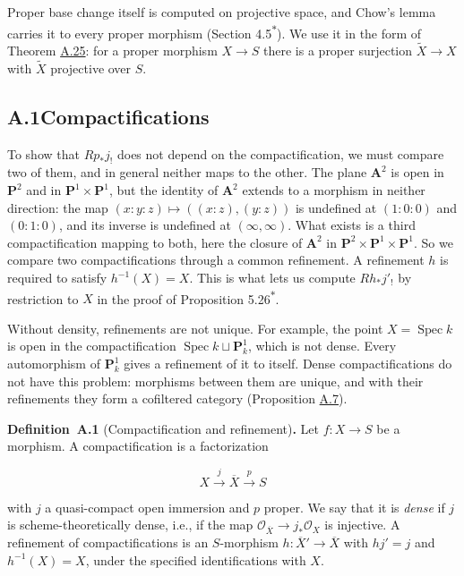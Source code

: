 \documentclass[11pt]{article}
\newenvironment{bpstatement}[2]{\par\addvspace{0.6\baselineskip}\noindent\textbf{#1}#2\textbf{.}\enspace\ignorespaces}
  {\par\addvspace{0.4\baselineskip}}
\newcommand{\bpout}[1]{#1\textsuperscript{\hyperlink{bp-outside}{\ensuremath{\ast}}}}
\begin{document}
Proper base change itself is computed on projective space, and Chow's lemma carries it to every proper morphism (Section \bpout{4.5}). We use it in the form of Theorem \hyperref[bp73]{A.25}: for a proper morphism \(X\to S\) there is a proper surjection \(\widetilde X\to X\) with \(\widetilde X\) projective over \(S\).

\subsection*{\texorpdfstring{A.1\quad Compactifications}{A.1 Compactifications}}
\label{bp5}%
\label{bp6}%
To show that \(Rp_*j_!\) does not depend on the compactification, we must compare two of them, and in general neither maps to the other. The plane \(\mathbf A^2\) is open in \(\mathbf P^2\) and in \(\mathbf P^1\times\mathbf P^1\), but the identity of \(\mathbf A^2\) extends to a morphism in neither direction: the map \((x:y:z)\mapsto((x:z),(y:z))\) is undefined at \((1:0:0)\) and \((0:1:0)\), and its inverse is undefined at \((\infty,\infty)\). What exists is a third compactification mapping to both, here the closure of \(\mathbf A^2\) in \(\mathbf P^2\times\mathbf P^1\times\mathbf P^1\). So we compare two compactifications through a common refinement. A refinement \(h\) is required to satisfy \(h^{-1}(X)=X\). This is what lets us compute \(Rh_*j'_!\) by restriction to \(X\) in the proof of Proposition \bpout{5.26}.

Without density, refinements are not unique. For example, the point \(X=\operatorname{Spec}k\) is open in the compactification \(\operatorname{Spec}k\sqcup\mathbf P^1_k\), which is not dense. Every automorphism of \(\mathbf P^1_k\) gives a refinement of it to itself. Dense compactifications do not have this problem: morphisms between them are unique, and with their refinements they form a cofiltered category (Proposition \hyperref[bp21]{A.7}).

\label{bp7}%
\begin{bpstatement}{Definition~A.1}{ (Compactification and refinement)}
Let \(f:X\to S\) be a morphism. A compactification is a factorization

\[
X\xrightarrow{j}\overline X\xrightarrow{p}S
\]

with \(j\) a quasi-compact open immersion and \(p\) proper. We say that it is \emph{dense} if \(j\) is scheme-theoretically dense, i.e., if the map \(\mathcal O_{\overline X}\to j_*\mathcal O_X\) is injective. A refinement of compactifications is an \(S\)-morphism \(h:\overline X'\to\overline X\) with \(hj'=j\) and \(h^{-1}(X)=X\), under the specified identifications with \(X\).
\end{bpstatement}
\end{document}
